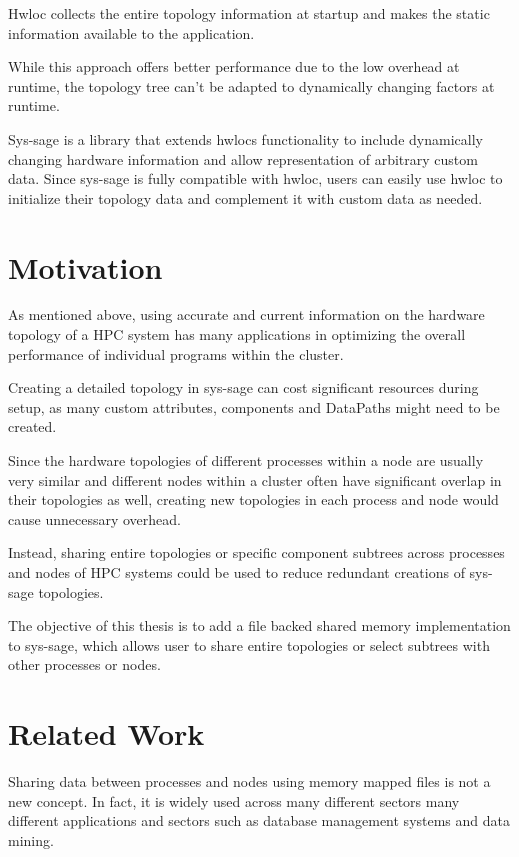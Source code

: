 Hwloc collects the entire topology information at startup and makes the static information available to the application. \cite{hwloc_paper}

While this approach offers better performance due to the low overhead at runtime, the topology tree can't be adapted to dynamically changing factors at runtime.

Sys-sage \cite{sys-sage} is a library that extends hwlocs functionality to include dynamically changing hardware information and allow representation of arbitrary custom data.
Since sys-sage is fully compatible with hwloc, users can easily use hwloc to initialize their topology data and complement it with custom data as needed.

\section{Motivation}
As mentioned above, using accurate and current information on the hardware topology of a HPC system
has many applications in optimizing the overall performance of individual programs within the cluster.

Creating a detailed topology in sys-sage can cost significant resources during setup, as many custom attributes, components and DataPaths might need to be created.

Since the hardware topologies of different processes within a node are usually very similar
and different nodes within a cluster often have significant overlap in their topologies as well, creating new topologies in each process and node would cause unnecessary overhead.

Instead, sharing entire topologies or specific component subtrees across processes and nodes of HPC systems could be used to reduce redundant creations of sys-sage topologies.

The objective of this thesis is to add a file backed shared memory implementation to sys-sage, which allows user to share entire topologies or select subtrees with other processes or nodes.

\section{Related Work}\label{section:related_work}
Sharing data between processes and nodes using memory mapped files is not a new concept. In fact, it is widely used across many different sectors many different applications and sectors such as
database management systems and data mining. \cite{crotty22-mmap} \cite{mmap_related_work}

